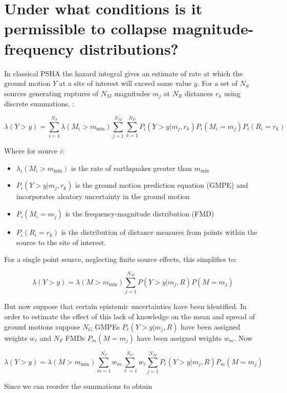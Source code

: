 \documentclass{article}
\begin{document}
\section{Under what conditions is it permissible to collapse magnitude-frequency distributions?}

In classical PSHA the hazard integral gives an estimate of rate at which the ground motion $Y$ at a site of interest will exceed some value $y$. For a set of $N_S$ sources generating ruptures of $N_M$ magnitudes $m_j$ at $N_R$ distances $r_k$ using discrete summations,  \citep{baker2008introduction}:

\begin{equation} \label{eq:HazardIntegral} 
\lambda(Y > y) = 
\sum_{i=1}^{N_S} 
\lambda(M_i > m_\text{min}) 
\sum_{j=1}^{N_M} 
\sum_{k=1}^{N_R} 
P_i(Y > y|m_j,r_k) 
P_i(M_i=m_j) 
P_i(R_i=r_k)
\end{equation}

Where for source $i$:
\begin{itemize}
\item $\lambda_i(M_i > m_\text{min})$ is the rate of earthquakes greater than $m_\text{min}$
\item $P_i(Y > y|m_j,r_k)$ is the ground motion prediction equation (GMPE) and incorporates aleatory uncertainty in the ground motion
\item $P_i(M_i=m_j)$ is the frequency-magnitude distribution (FMD)
\item $P_i(R_i=r_k)$ is the distribution of distance measures from points within the source to the site of interest.
\end{itemize}

For a single point source, neglecting finite source effects, this simplifies to:

$$ \lambda(Y > y) = 
\lambda(M > m_\text{min}) 
\sum_{j=1}^{N_M} 
P(Y > y|m_j,R) 
P(M=m_j) $$

But now suppose that certain epistemic uncertainties have been identified. 
In order to estimate the effect of this lack of knowledge on the mean and spread of ground motions suppose $N_G$ GMPEs $P_\ell(Y > y|m_j,R)$ have been assigned weights $w_\ell$ and $N_F$ FMDs $P_m(M=m_j)$ have been assigned weights $w_m$. 
Now

$$ \lambda(Y > y) = 
\lambda(M > m_\text{min}) 
\sum_{m=1}^{N_F} w_m 
\sum_{\ell=1}^{N_G} w_\ell 
\sum_{j=1}^{N_M} 
P_\ell(Y > y|m_j,R) 
P_m(M=m_j) $$

Since we can reorder the summations to obtain
\end{document}

